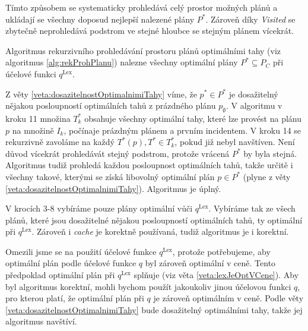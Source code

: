 Tímto způsobem se systematicky prohledává celý prostor možných plánů a ukládají se všechny doposud nejlepší nalezené plány $P^*$.
Zároveň díky \textit{Visited} se zbytečně neprohledává podstrom ve stejné hloubce se stejným plánem vícekrát.

\begin{veta}\label{}
  Algoritmus rekurzivního prohledávání prostoru plánů optimálními tahy (viz algoritmus \ref{alg:rekProhPlanu}) nalezne všechny optimální plány $P^* \subseteq P_C$ při účelové funkci $q^{\text{Lex}}$.
\end{veta}
\begin{dukaz}
  Z věty \ref{veta:dosazitelnostOptimalnimiTahy} víme, že $p^* \in P^*$ je dosažitelný nějakou posloupností optimálních tahů z prázdného plánu $p_{\emptyset}$. 
  V algoritmu v kroku 11 množina $T^*_k$ obsahuje všechny optimální tahy, které lze provést na plánu $p$ na množině $I_k$, počínaje prázdným plánem a prvním incidentem.
  V kroku 14 se rekurzivně zavoláme na každý $T^*(p), T^* \in T^*_k$, pokud již nebyl navštíven.
  Není důvod vícekrát prohledávát stejný podstrom, protože vrácená $P^*$ by byla stejná.
  Algoritmus tudiž prohledá každou posloupnost optimálních tahů, takže určitě i všechny takové, kterými se získá libovolný optimální plán $p \in P^*$ (plyne z věty \ref{veta:dosazitelnostOptimalnimiTahy}).
  Algoritmus je úplný.

  V krocích 3-8 vybíráme pouze plány optimální vůči $q^{\text{Lex}}$.
  Vybíráme tak ze všech plánů, které jsou dosažitelné nějakou posloupností optimálních tahů, ty optimální při $q^{\text{Lex}}$.
  Zároveň i \textit{cache} je korektně používaná, tudiž algoritmus je i korektní.
\end{dukaz}

Omezili jsme se na použití účelové funkce $q^{\text{Lex}}$, protože potřebujeme, aby optimální plán podle účelové funkce $q$ byl zároveň optimální v ceně.
Tento předpoklad optimální plán při $q^{\text{Lex}}$ splňuje (viz věta \ref{veta:lexJeOptVCene}).
Aby byl algoritmus korektní, mohli bychom použít jakoukoliv jinou účelovou funkci $q$, pro kterou platí, že optimální plán při $q$ je zároveň optimálním v ceně.
Podle věty \ref{veta:dosazitelnostOptimalnimiTahy} bude dosažitelný optimálními tahy, takže jej algoritmus navštíví.

